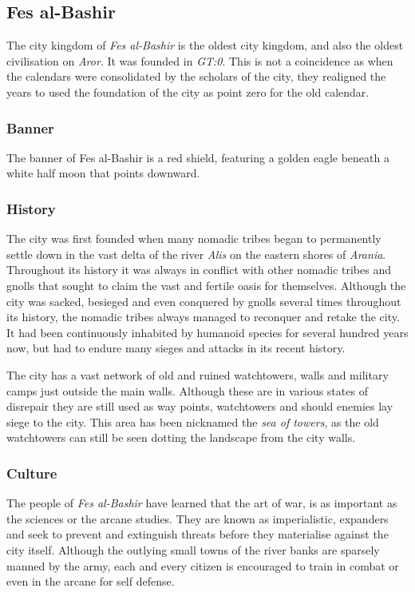 \subsection*{Fes al-Bashir}

The city kingdom of \emph{Fes al-Bashir} is the oldest city kingdom, and also
the oldest civilisation on \emph{Aror}. It was founded in \emph{GT:0}. This
is not a coincidence as when the calendars were consolidated by the scholars
of the city, they realigned the years to used the foundation of the city as
point zero for the old calendar.

\subsubsection*{Banner}

The banner of Fes al-Bashir is a red shield, featuring a golden eagle beneath
a white half moon that points downward.

\subsubsection*{History}

The city was first founded when many nomadic tribes began to permanently
settle down in the vast delta of the river \emph{Alis} on the eastern shores
of \emph{Arania}. Throughout its history it was always in conflict with other
nomadic tribes and gnolls that sought to claim the vast and fertile oasis for
themselves. Although the city was sacked, besieged and even conquered by
gnolls several times throughout its history, the nomadic tribes always managed
to reconquer and retake the city. It had been continuously inhabited by
humanoid species for several hundred years now, but had to endure many sieges
and attacks in its recent history.

The city has a vast network of old and ruined watchtowers, walls and military
camps just outside the main walls. Although these are in various states of
disrepair they are still used as way points, watchtowers and should enemies
lay siege to the city. This area has been nicknamed the \emph{sea of towers},
as the old watchtowers can still be seen dotting the landscape from the city
walls.

\subsubsection*{Culture}

The people of \emph{Fes al-Bashir} have learned that the art of war, is as
important as the sciences or the arcane studies. They are known as
imperialistic, expanders and seek to prevent and extinguish threats before
they materialise against the city itself. Although the outlying small towns of
the river banks are sparsely manned by the army, each and every citizen is
encouraged to train in combat or even in the arcane for self defense.

